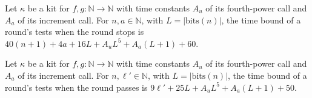 \begin{definition}
\label{Turing.NTimeDiag.qyTestS}
\leanok
{}
Let $\kappa$ be a kit for $f, g : \mathbb{N} \to \mathbb{N}$ with time constants $A_u$ of its
fourth-power call and $A_a$ of its increment call. For $n, a \in \mathbb{N}$, with $L =
|\mathrm{bits}(n)|$, the time bound of a round's tests when the round stops is $40(n + 1) + 4a +
16L + A_u L^5 + A_a(L + 1) + 60$.
\end{definition}

\begin{definition}
\label{Turing.NTimeDiag.qyTestP}
\leanok
{}
Let $\kappa$ be a kit for $f, g : \mathbb{N} \to \mathbb{N}$ with time constants $A_u$ of its
fourth-power call and $A_a$ of its increment call. For $n, \ell' \in \mathbb{N}$, with $L =
|\mathrm{bits}(n)|$, the time bound of a round's tests when the round passes is $9\ell' + 25L + A_u
L^5 + A_a(L + 1) + 50$.
\end{definition}

